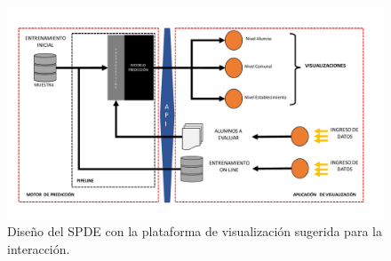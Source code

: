 \begin{figure}[H]
  \centering
    \includegraphics[trim=0cm 0cm 0cm 0cm,scale=0.45]{Figuras/6SolucionPropuesta/Sistema.pdf}
      \caption{Diseño del SPDE con la plataforma de visualización sugerida para la interacción.}
    \label{fig:SPDE}
\end{figure}

